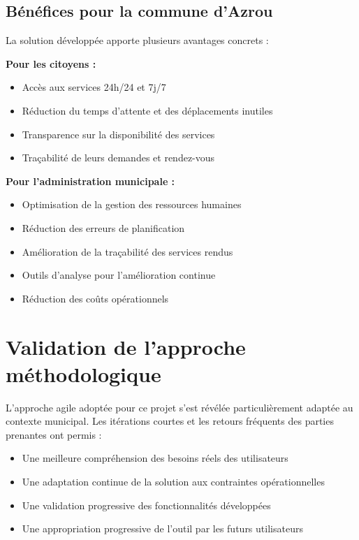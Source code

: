 \subsection*{Bénéfices pour la commune d'Azrou}

La solution développée apporte plusieurs avantages concrets :

\textbf{Pour les citoyens :}
\begin{itemize}
    \item Accès aux services 24h/24 et 7j/7
    \item Réduction du temps d'attente et des déplacements inutiles
    \item Transparence sur la disponibilité des services
    \item Traçabilité de leurs demandes et rendez-vous
\end{itemize}

\textbf{Pour l'administration municipale :}
\begin{itemize}
    \item Optimisation de la gestion des ressources humaines
    \item Réduction des erreurs de planification
    \item Amélioration de la traçabilité des services rendus
    \item Outils d'analyse pour l'amélioration continue
    \item Réduction des coûts opérationnels
\end{itemize}

\section*{Validation de l'approche méthodologique}

L'approche agile adoptée pour ce projet s'est révélée particulièrement adaptée au contexte municipal. Les itérations courtes et les retours fréquents des parties prenantes ont permis :

\begin{itemize}
    \item Une meilleure compréhension des besoins réels des utilisateurs
    \item Une adaptation continue de la solution aux contraintes opérationnelles
    \item Une validation progressive des fonctionnalités développées
    \item Une appropriation progressive de l'outil par les futurs utilisateurs
\end{itemize}


